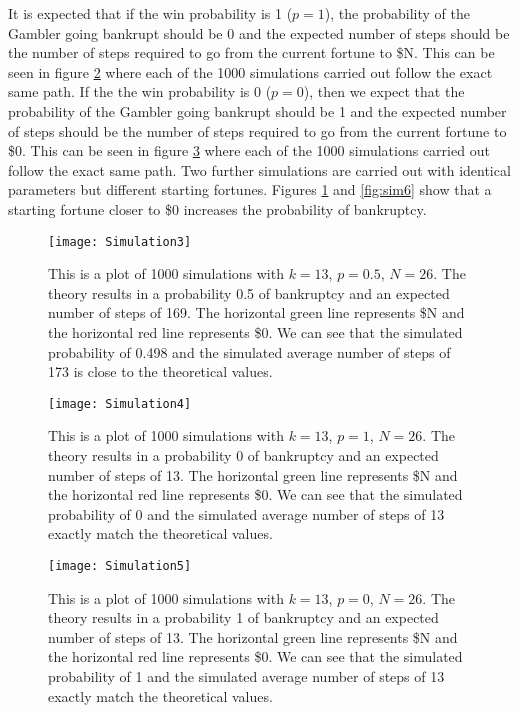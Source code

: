 \documentclass{article}
\begin{document}
It is expected that if the win probability is 1 ($p=1$), the probability of the Gambler going bankrupt should be 0 and the expected number of steps should be the number of steps required to go from the current fortune to \$N. This can be seen in figure \ref{fig:sim4} where each of the 1000 simulations carried out follow the exact same path. If the the win probability is 0 ($p=0$), then we expect that the probability of the Gambler going bankrupt should be 1 and the expected number of steps should be the number of steps required to go from the current fortune to \$0. This can be seen in figure \ref{fig:sim5} where each of the 1000 simulations carried out follow the exact same path. Two further simulations are carried out with identical parameters but different starting fortunes. Figures \ref{fig:sim3} and \ref{fig:sim6} show that a starting fortune closer to \$0 increases the probability of bankruptcy.

\begin{figure}
    \centering
    \texttt{[image: Simulation3]}
    \caption{This is a plot of 1000 simulations with $k = 13$, $p = 0.5$, $N = 26$. The theory results in a probability 0.5 of bankruptcy and an expected number of steps of 169. The horizontal green line represents \$N and the horizontal red line represents \$0. We can see that the simulated probability of 0.498 and the simulated average number of steps of 173 is close to the theoretical values.}
    \label{fig:sim3}
\end{figure}

\begin{figure}
    \centering
    \texttt{[image: Simulation4]}
    \caption{This is a plot of 1000 simulations with $k = 13$, $p = 1$, $N = 26$. The theory results in a probability 0 of bankruptcy and an expected number of steps of 13. The horizontal green line represents \$N and the horizontal red line represents \$0. We can see that the simulated probability of 0 and the simulated average number of steps of 13 exactly match the theoretical values.}
    \label{fig:sim4}
\end{figure}

\begin{figure}[r]
    \centering
    \texttt{[image: Simulation5]}
    \caption{This is a plot of 1000 simulations with $k = 13$, $p = 0$, $N = 26$. The theory results in a probability 1 of bankruptcy and an expected number of steps of 13. The horizontal green line represents \$N and the horizontal red line represents \$0. We can see that the simulated probability of 1 and the simulated average number of steps of 13 exactly match the theoretical values.}
    \label{fig:sim5}
\end{figure}
\end{document}

